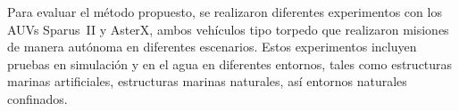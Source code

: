 Para evaluar el método propuesto, se realizaron diferentes experimentos con los
AUVs Sparus~II y AsterX, ambos vehículos tipo torpedo que realizaron
misiones de manera autónoma en diferentes escenarios. Estos experimentos
incluyen pruebas en simulación y en el agua en diferentes entornos, tales como
estructuras marinas artificiales, estructuras marinas naturales, así entornos
naturales confinados.

\vfill


\endgroup			

\vfill